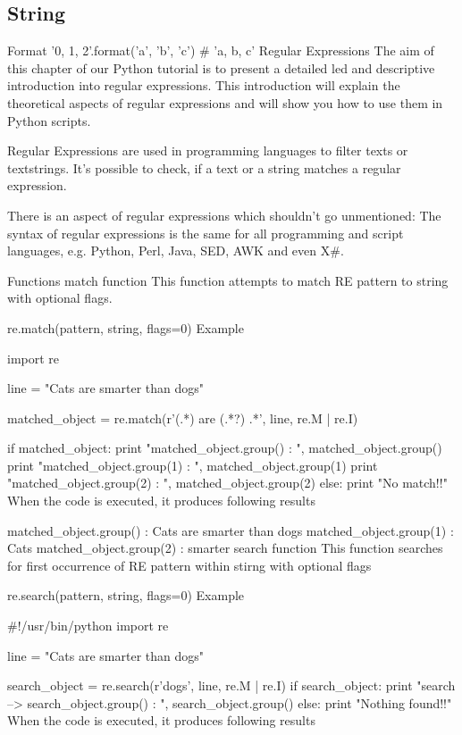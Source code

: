 \subsection{String}

Format
'{0}, {1}, {2}'.format('a', 'b', 'c')
# 'a, b, c'
Regular Expressions
The aim of this chapter of our Python tutorial is to present a detailed led and descriptive introduction into regular expressions. This introduction will explain the theoretical aspects of regular expressions and will show you how to use them in Python scripts.

Regular Expressions are used in programming languages to filter texts or textstrings. It's possible to check, if a text or a string matches a regular expression.

There is an aspect of regular expressions which shouldn't go unmentioned: The syntax of regular expressions is the same for all programming and script languages, e.g. Python, Perl, Java, SED, AWK and even X#.

Functions
match function
This function attempts to match RE pattern to string with optional flags.

re.match(pattern, string, flags=0)
Example

import re

line = "Cats are smarter than dogs"

matched_object = re.match(r'(.*) are (.*?) .*', line, re.M | re.I)

if matched_object:
    print "matched_object.group()  : ", matched_object.group()
    print "matched_object.group(1) : ", matched_object.group(1)
    print "matched_object.group(2) : ", matched_object.group(2)
else:
    print "No match!!"
When the code is executed, it produces following results

matched_object.group()  :  Cats are smarter than dogs
matched_object.group(1) :  Cats
matched_object.group(2) :  smarter
search function
This function searches for first occurrence of RE pattern within stirng with optional flags

re.search(pattern, string, flags=0)
Example

#!/usr/bin/python
import re

line = "Cats are smarter than dogs"

search_object = re.search(r'dogs', line, re.M | re.I)
if search_object:
    print "search --> search_object.group() : ", search_object.group()
else:
    print "Nothing found!!"
When the code is executed, it produces following results

